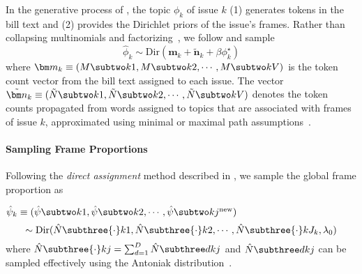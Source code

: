 In the generative process of \name{}, the topic $\phi_k$ of issue $k$ (1)
generates tokens in the bill text and (2) provides the Dirichlet priors of the
issue's frames. Rather than collapsing multinomials and factorizing~\cite{hu-12:fttm},
we follow  and sample
\begin{equation}
  \hat{\phi}_k \sim \mbox{Dir} (\bm m_k + \tilde{\bm n}_k + \beta \phi_k^{\star})
  \label{eq:phi_samp}
\end{equation}
where $\bm m_k \equiv (M \subtwo k1, M \subtwo k2, \cdots, M \subtwo
kV)$ is the token count vector from the bill text assigned to each
issue. The vector $\tilde{\bm n}_k \equiv (\tilde{N} \subtwo k1,
\tilde{N} \subtwo k2, \cdots, \tilde{N} \subtwo kV)$ denotes the token
counts propagated from words assigned to topics that are associated
with frames of issue $k$, approximated using minimal or maximal path
assumptions~\cite{Cowans:PhD06,Wallach:PhD08}.

\paragraph{Sampling Frame Proportions}

Following the \textit{direct assignment} method described in , we sample the global frame proportion as 

$\hat{\psi}_k \equiv (\hat{\psi} \subtwo k1, \hat{\psi} \subtwo k2, \cdots, \hat{\psi} \subtwo k{j^{\mbox{\scriptsize new}}})$
\begin{equation}
 \sim \mbox{Dir} (\hat{N} \subthree {\cdot}k1, \hat{N} \subthree {\cdot}k2,
 \cdots, \hat{N} \subthree {\cdot}k{J_k}, \lambda_0)
\end{equation}
where $\hat{N} \subthree {\cdot}kj = \sum_{d=1}^D \hat{N} \subthree dkj$ and $\hat{N} \subthree
dkj$ can be sampled effectively using the Antoniak distribution~\cite{Aantoniak:AS74}.



